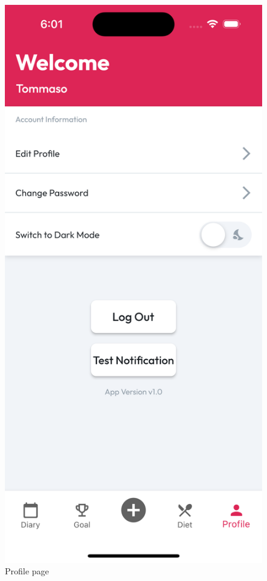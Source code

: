 \documentclass{Configuration_Files/PoliMi3i_thesis}
\begin{document}
\begin{figure}[!h]
  \includegraphics[scale=0.1]{Images/Screenshots/Mobile/ProfileLight.png}
  \caption{Profile page}
\end{figure}

\clearpage
\end{document}
